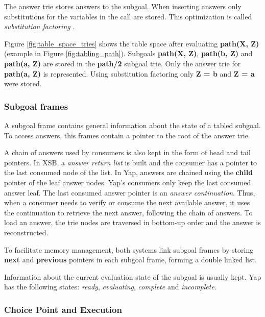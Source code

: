   The answer trie stores answers to the subgoal. When inserting answers only substitutions
  for the variables in the call are stored. This optimization is called \textit{substitution factoring} \cite{RamakrishnanIV-95}.
  
  Figure \ref{fig:table_space_tries} shows the table space after evaluating \textbf{path(X, Z)} (example in Figure \ref{fig:tabling_path}).
  Subgoals \textbf{path(X, Z)}, \textbf{path(b, Z)} and \textbf{path(a, Z)} are stored in the \textbf{path/2} subgoal trie.
  Only the answer trie for \textbf{path(a, Z)} is represented. Using substitution factoring only \textbf{Z = b} and \textbf{Z = a}
  were stored.
  
  \subsubsection{Subgoal frames}
  
  A subgoal frame contains general information about the state of a tabled subgoal.
  To access answers, this frames contain a pointer to the root of the answer trie.
  
  A chain of answers used by consumers is also kept in the form of head and tail pointers.
  In XSB, a \textit{answer return list} is built and the consumer has a pointer to the last consumed node of the list.
  In Yap, answers are chained using the \textbf{child} pointer of the leaf answer nodes. Yap's consumers only keep
  the last consumed answer leaf. The last consumed answer pointer is an \textit{answer continuation}. Thus, when
  a consumer needs to verify or consume the next available answer, it uses the continuation to retrieve the next
  answer, following the chain of answers. To load an answer, the trie nodes are traversed in bottom-up order and the answer is reconstructed.
  
  To facilitate memory management, both systems link subgoal frames by storing \textbf{next} and \textbf{previous} pointers in each subgoal frame,
  forming a double linked list.
  
  Information about the current evaluation state of the subgoal is usually kept. Yap has the following states:
  \textit{ready}, \textit{evaluating}, \textit{complete} and \textit{incomplete}.
  
  \subsubsection{Choice Point and Execution}
  
